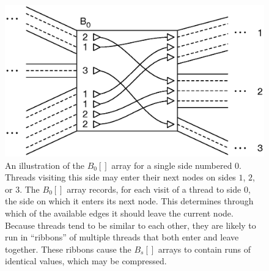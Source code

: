 \begin{figure}[h!]
\centering
\includegraphics[width=\linewidth]{figures/03_gpbwt/barray.eps}
\caption{An illustration of the $B_{0}[]$ array for a single side numbered $0$. Threads visiting this side may enter their next nodes on sides $1$, $2$, or $3$. The $B_0[]$ array records, for each visit of a thread to side $0$, the side on which it enters its next node. This determines through which of the available edges it should leave the current node. Because threads tend to be similar to each other, they are likely to run in ``ribbons'' of multiple threads that both enter and leave together. These ribbons cause the $B_s[]$ arrays to contain runs of identical values, which may be compressed.}
\label{fig:barray}
\end{figure}

